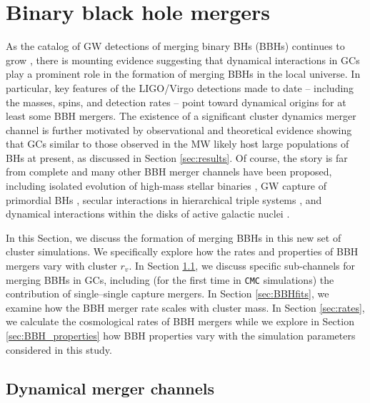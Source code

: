 \documentclass[twocolumn,tighten]{aastex63}
\begin{document}
\section{Binary black hole mergers}
\label{sec:BBHs}

As the catalog of GW detections of merging binary BHs (BBHs) continues to grow \citep{LIGO2018a}, there is mounting evidence suggesting that dynamical interactions in GCs play a prominent role in the formation of merging BBHs in the local universe. In particular, key features of the LIGO/Virgo detections made to date -- including the masses, spins, and detection rates -- point toward dynamical origins for at least some BBH mergers. The existence of a significant cluster dynamics merger channel is further motivated by observational and theoretical evidence showing that GCs similar to those observed in the MW likely host large populations of BHs at present, as discussed in Section \ref{sec:results}. Of course, the story is far from complete and many other BBH merger channels have been proposed, including isolated evolution of high-mass stellar binaries \citep[e.g.,][]{Dominik2012,Dominik2013,Belczynski2016a,Belczynski2016b}, GW capture of primordial BHs \citep[e.g.,][]{Bird2016,Sasaki2016}, secular interactions in hierarchical triple systems \citep[e.g.,][]{AntoniniRasio2016,Antonini2017,Silsbee2017, Hoang2018,Leigh2018,RodriguezAntonini2018,Fragkoc2019,Fragleipern2019}, and dynamical interactions within the disks of active galactic nuclei \citep[e.g.,][]{Bartos2017,Yang2019}.

In this Section, we discuss the formation of merging BBHs in this new set of cluster simulations. We specifically explore how the rates and properties of BBH mergers vary with cluster $r_v$. In Section \ref{sec:merger_channels}, we discuss specific sub-channels for merging BBHs in GCs, including (for the first time in \texttt{CMC} simulations) the contribution of single--single capture mergers. In Section \ref{sec:BBHfits}, we examine how the BBH merger rate scales with cluster mass. In Section \ref{sec:rates}, we calculate the cosmological rates of BBH mergers while we explore in Section \ref{sec:BBH_properties} how BBH properties vary with the simulation parameters considered in this study.

\subsection{Dynamical merger channels}
\label{sec:merger_channels}
\end{document}
